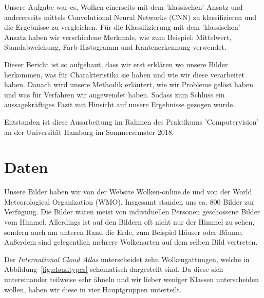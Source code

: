 \documentclass[a4,german]{article}
\begin{document}
Unsere Aufgabe war es, Wolken einerseits mit dem 'klassischen' Ansatz und andererseits mittels Convolutional Neural Networks (CNN) zu klassifizieren und die Ergebnisse zu vergleichen. 
Für die Klassifizierung mit dem 'klassischen' Ansatz haben wir verschiedene Merkmale, wie zum Beispiel: Mittelwert, Standabweichung, Farb-Histogramm und Kantenerkennung verwendet.
 
 Dieser Bericht ist so aufgebaut, dass wir erst erklären wo unsere Bilder herkommen, was für Charakteristika sie haben und wie wir diese verarbeitet haben. Danach wird unsere Methodik erläutert, wie wir Probleme gelöst haben und was für Verfahren wir angewendet haben. Sodass zum Schluss ein aussagekräftiges Fazit mit Hinsicht auf unsere Ergebnisse gezogen wurde.
 
Entstanden ist diese Ausarbeitung im Rahmen des Praktikums 'Computervision' an der Universität Hamburg im Sommersemster 2018.



\section{Daten}


Unsere Bilder haben wir von der Website Wolken-online.de und von der World Meteorological Organization (WMO).
Insgesamt standen uns ca. 800 Bilder zur Verfügung.
Die Bilder waren meist von individuellen Personen geschossene Bilder vom Himmel. 
Allerdings ist auf den Bildern oft nicht nur der Himmel zu sehen, sondern auch am unteren Rand die Erde, zum Beispiel Häuser oder Bäume. Außerdem sind gelegentlich mehrere Wolkenarten auf dem selben Bild vertreten.

Der \textit{International Cloud Atlas} unterscheidet zehn Wolkengattungen, welche in Abbildung~\ref{fig:cloudtypes} schematisch dargestellt sind. Da diese sich untereinander teilweise sehr ähneln und wir lieber weniger Klassen unterscheiden wollen, haben wir diese in vier Hauptgruppen unterteilt.
\end{document}
